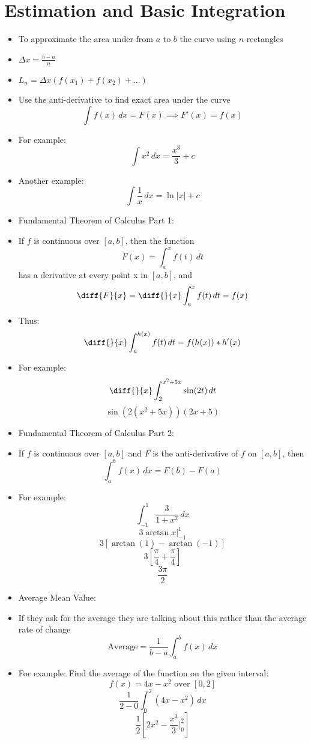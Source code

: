 \documentclass{article}
\newcommand{\intbar}{\biggr\rvert}
\begin{document}
\section{Estimation and Basic Integration}
\begin{itemize}
    \item To approximate the area under from $a$ to $b$ the curve using $n$ rectangles
    \item $\Delta x = \frac{b-a}{n}$
    \item $L_n = \Delta x(f(x_1) + f(x_2) + ...)$
    \item Use the anti-derivative to find exact area under the curve
        \[\int f(x)\,dx = F(x)\implies F'(x) = f(x)\]
    \item For example:
        \[\int x^2\,dx = \boxed{\frac{x^3}{3}+c}\]
    \item Another example:
        \[\int \frac{1}{x}\,dx = \boxed{\ln|x|+c}\]
    \item Fundamental Theorem of Calculus Part 1:
    \item If $f$ is continuous over $[a,b]$, then the function
        \[F(x) = \int_a^x f(t)\,dt\]
    has a derivative at every point x in $[a,b]$, and
        \[\diff{F}{x} = \diff{}{x}\int_a^x f(t)\,dt = f(x)\]
    \item Thus:
        \[\diff{}{x}\int_a^{h(x)} f(t)\,dt = f(h(x))*h'(x)\]
    \item For example:
        \[\diff{}{x}\int_2^{x^2+5x} \sin(2t)\,dt\]
        \[\sin(2(x^2+5x))(2x+5)\]
    \item Fundamental Theorem of Calculus Part 2:
    \item If $f$ is continuous over $[a,b]$ and $F$ is the anti-derivative of $f$ on $[a,b]$, then
        \[\int_a^b f(x)\,dx = F(b) - F(a)\]
    \item For example:
        \[\int_{-1}^1\frac{3}{1+x^2}\,dx\]
        \[3\arctan x\intbar_{-1}^1\]
        \[3\left[\arctan(1)-\arctan(-1)\right]\]
        \[3\left[\frac{\pi}{4}+\frac{\pi}{4}\right]\]
        \[\boxed{\frac{3\pi}{2}}\]
    \item Average Mean Value:
    \item If they ask for the average they are talking about this rather than the average rate of change
    \[\text{Average} = \frac{1}{b-a}\int_a^b f(x)\,dx\]
    \item For example: Find the average of the function on the given interval:
        \[f(x) = 4x-x^2 \text{ over }[0,2]\]
        \[\frac{1}{2-0}\int_0^2 (4x-x^2)\,dx\]
        \[\frac{1}{2}\left[2x^2-\frac{x^3}{3}\intbar_0^2\right]\]

\end{itemize}
\end{document}
